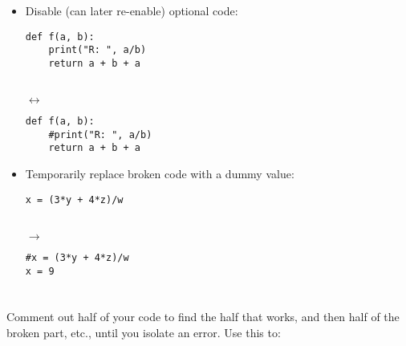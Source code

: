 \documentclass{poster}
\begin{document}
\begin{itemize}

\item Disable (can later re-enable) optional code: \\
\noindent
\begin{minipage}[t]{0.45\columnwidth}
\begin{lstlisting}
def f(a, b):
    print("R: ", a/b)
    return a + b + a
\end{lstlisting}
\end{minipage}
\begin{minipage}[t]{0.05\columnwidth}
\  \\
\hspace*{1ex}$\leftrightarrow$
\end{minipage}
\begin{minipage}[t]{0.45\columnwidth}
\begin{lstlisting}
def f(a, b):
    #print("R: ", a/b)
    return a + b + a
\end{lstlisting}
\end{minipage}

\item Temporarily replace broken code with a dummy value: \\
\noindent
\begin{minipage}[t]{0.45\columnwidth}
\begin{lstlisting}
x = (3*y + 4*z)/w
\end{lstlisting}
\end{minipage}
\begin{minipage}[t]{0.05\columnwidth}
\  \\
\hspace*{1ex}$\rightarrow$
\end{minipage}
\begin{minipage}[t]{0.45\columnwidth}
\begin{lstlisting}
#x = (3*y + 4*z)/w
x = 9
\end{lstlisting}
\end{minipage}

\end{itemize}


\section{}

Comment out half of your code to find the half that works, and then half of the broken part, etc., until you isolate an error. Use this to:
\end{document}
